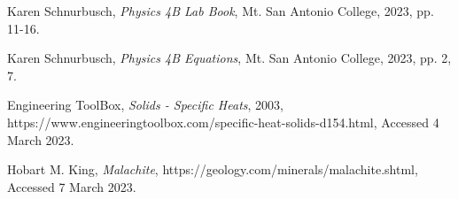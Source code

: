\documentclass[12pt]{iopart} %
\begin{document}
\begin{thebibliography}{9}

  Karen Schnurbusch,
  \textit{Physics 4B Lab Book},
  Mt. San Antonio College,
  2023,
  pp. 11-16.

  Karen Schnurbusch,
  \textit{Physics 4B Equations},
  Mt. San Antonio College,
  2023,
  pp. 2, 7.

  Engineering ToolBox,
  \textit{Solids - Specific Heats},
  2003,
  https://www.engineeringtoolbox.com/specific-heat-solids-d\textunderscore{}154.html,
  Accessed 4 March 2023.

  Hobart M. King,
  \textit{Malachite},
  https://geology.com/minerals/malachite.shtml,
  Accessed 7 March 2023.

\end{thebibliography}
\end{document}
